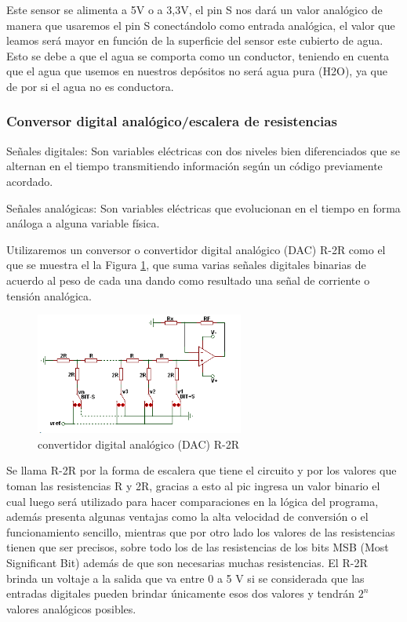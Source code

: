 \documentclass[a4paper]{article}
\begin{document}
Este sensor se alimenta a 5V o a 3,3V, el pin S nos dará un valor 
analógico de manera que usaremos el pin S conectándolo como entrada
 analógica, el valor que leamos será mayor en función de la superficie 
del sensor este cubierto de agua. Esto se debe a que el agua se comporta 
como un conductor, teniendo en cuenta que el agua que usemos en nuestros 
depósitos no será agua pura (H2O), ya que de por si el agua no es 
conductora.

\subsubsection*{Conversor digital analógico/escalera de resistencias}

Señales digitales: Son variables eléctricas con dos niveles bien 
diferenciados que se alternan en el tiempo transmitiendo información
 según un código previamente acordado.

Señales analógicas: Son variables eléctricas que evolucionan en el 
tiempo en forma análoga a alguna variable física.

Utilizaremos un conversor o convertidor digital analógico (DAC) R-2R 
como el que se muestra el la Figura \ref{fig:conversor}, que suma 
varias señales digitales binarias de acuerdo al peso de cada 
una dando como resultado una señal de corriente o tensión analógica.

\begin{figure}[h]\centering
    \includegraphics[height=4cm]{conversor.png}
    \caption{convertidor digital analógico (DAC) R-2R}
    \label{fig:conversor}
\end{figure}

Se llama R-2R por la forma de escalera que tiene el circuito y por 
los valores que toman las resistencias R y 2R, gracias a esto al pic 
ingresa un valor binario el cual luego será utilizado para hacer 
comparaciones en la lógica del programa, además presenta algunas 
ventajas como la alta velocidad de conversión o el funcionamiento 
sencillo, mientras que por otro lado los valores de las resistencias 
tienen que ser precisos, sobre todo los de las resistencias de los
 bits MSB (Most Significant Bit) además de que son necesarias muchas
 resistencias. El R-2R brinda un voltaje a la salida que va entre 0
 a 5 V si se considerada que las entradas digitales pueden brindar 
únicamente esos dos valores y tendrán $2^n$ valores analógicos 
posibles.
\end{document}
